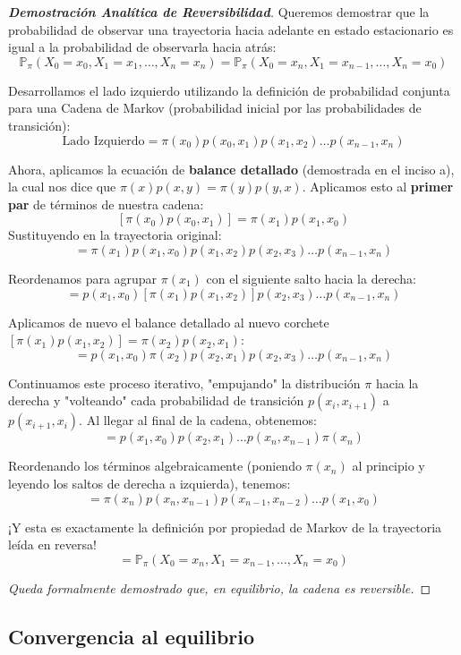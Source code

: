 \documentclass[10pt,a4paper]{article}
\begin{document}
\begin{proof}[\textbf{Demostración Analítica de Reversibilidad}]
    Queremos demostrar que la probabilidad de observar una trayectoria hacia adelante en estado estacionario es igual a la probabilidad de observarla hacia atrás:
    \[ \mathbb{P}_\pi(X_0=x_0, X_1=x_1, \dots, X_n=x_n) = \mathbb{P}_\pi(X_0=x_n, X_1=x_{n-1}, \dots, X_n=x_0) \]

    Desarrollamos el lado izquierdo utilizando la definición de probabilidad conjunta para una Cadena de Markov (probabilidad inicial por las probabilidades de transición):
    \[ \text{Lado Izquierdo} = \pi(x_0) p(x_0, x_1) p(x_1, x_2) \dots p(x_{n-1}, x_n) \]

    Ahora, aplicamos la ecuación de \textbf{balance detallado} (demostrada en el inciso a), la cual nos dice que $\pi(x)p(x,y) = \pi(y)p(y,x)$. 
    Aplicamos esto al \textbf{primer par} de términos de nuestra cadena:
    \[ [ \pi(x_0) p(x_0, x_1) ] = \pi(x_1) p(x_1, x_0) \]
    Sustituyendo en la trayectoria original:
    \[ = \pi(x_1) p(x_1, x_0) p(x_1, x_2) p(x_2, x_3) \dots p(x_{n-1}, x_n) \]
    
    Reordenamos para agrupar $\pi(x_1)$ con el siguiente salto hacia la derecha:
    \[ = p(x_1, x_0) [ \pi(x_1) p(x_1, x_2) ] p(x_2, x_3) \dots p(x_{n-1}, x_n) \]
    
    Aplicamos de nuevo el balance detallado al nuevo corchete $[ \pi(x_1) p(x_1, x_2) ] = \pi(x_2) p(x_2, x_1)$:
    \[ = p(x_1, x_0) \pi(x_2) p(x_2, x_1) p(x_2, x_3) \dots p(x_{n-1}, x_n) \]
    
    Continuamos este proceso iterativo, "empujando" la distribución $\pi$ hacia la derecha y "volteando" cada probabilidad de transición $p(x_i, x_{i+1})$ a $p(x_{i+1}, x_i)$. Al llegar al final de la cadena, obtenemos:
    \[ = p(x_1, x_0) p(x_2, x_1) \dots p(x_n, x_{n-1}) \pi(x_n) \]

    Reordenando los términos algebraicamente (poniendo $\pi(x_n)$ al principio y leyendo los saltos de derecha a izquierda), tenemos:
    \[ = \pi(x_n) p(x_n, x_{n-1}) p(x_{n-1}, x_{n-2}) \dots p(x_1, x_0) \]

    ¡Y esta es exactamente la definición por propiedad de Markov de la trayectoria leída en reversa!
    \[ = \mathbb{P}_\pi(X_0=x_n, X_1=x_{n-1}, \dots, X_n=x_0) \]
    
    \textit{Queda formalmente demostrado que, en equilibrio, la cadena es reversible.}
\end{proof}

\newpage
\subsection{Convergencia al equilibrio}
\end{document}
